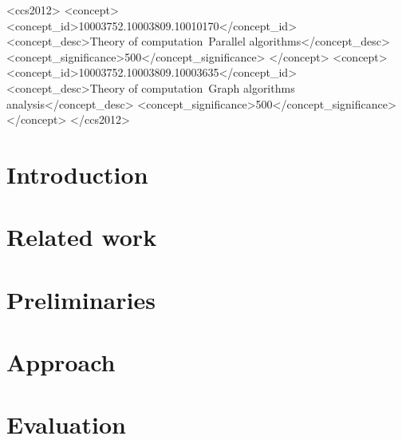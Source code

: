 \documentclass[sigconf,nonacm]{acmart}
\begin{document}
\begin{CCSXML}
<ccs2012>
<concept>
<concept_id>10003752.10003809.10010170</concept_id>
<concept_desc>Theory of computation~Parallel algorithms</concept_desc>
<concept_significance>500</concept_significance>
</concept>
<concept>
<concept_id>10003752.10003809.10003635</concept_id>
<concept_desc>Theory of computation~Graph algorithms analysis</concept_desc>
<concept_significance>500</concept_significance>
</concept>
</ccs2012>
\end{CCSXML}






\maketitle

\section{Introduction}
\label{sec:introduction}


\section{Related work}
\label{sec:related}


\section{Preliminaries}
\label{sec:preliminaries}


\section{Approach}
\label{sec:approach}


\section{Evaluation}
\label{sec:evaluation}

\end{document}
